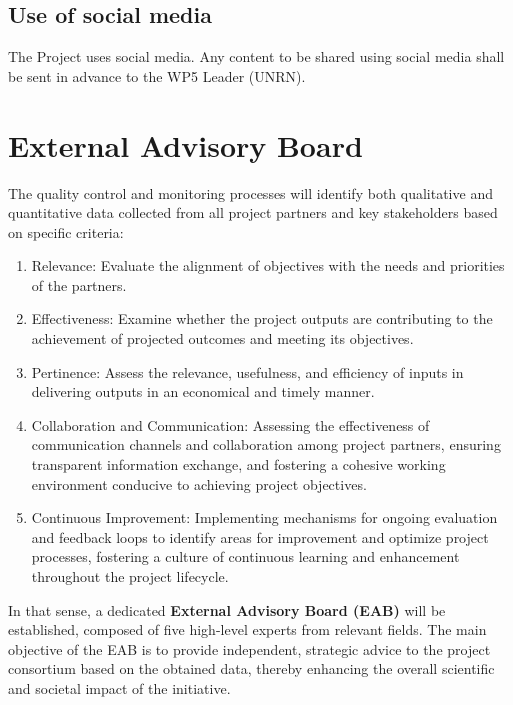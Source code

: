\documentclass[
  12pt,
  oneside]{book}
\providecommand{\tightlist}{%
  \setlength{\itemsep}{0pt}\setlength{\parskip}{0pt}}\usepackage{longtable,booktabs,array}
\begin{document}
\section{Use of social media}\label{use-of-social-media}

The Project uses social media. Any content to be shared using social
media shall be sent in advance to the WP5 Leader (UNRN).

\chapter{External Advisory Board}\label{external-advisory-board}

The quality control and monitoring processes will identify both
qualitative and quantitative data collected from all project partners
and key stakeholders based on specific criteria:

\begin{enumerate}
\def\labelenumi{\arabic{enumi}.}
\tightlist
\item
  Relevance: Evaluate the alignment of objectives with the needs and
  priorities of the partners.
\item
  Effectiveness: Examine whether the project outputs are contributing to
  the achievement of projected outcomes and meeting its objectives.
\item
  Pertinence: Assess the relevance, usefulness, and efficiency of inputs
  in delivering outputs in an economical and timely manner.
\item
  Collaboration and Communication: Assessing the effectiveness of
  communication channels and collaboration among project partners,
  ensuring transparent information exchange, and fostering a cohesive
  working environment conducive to achieving project objectives.
\item
  Continuous Improvement: Implementing mechanisms for ongoing evaluation
  and feedback loops to identify areas for improvement and optimize
  project processes, fostering a culture of continuous learning and
  enhancement throughout the project lifecycle.
\end{enumerate}

In that sense, a dedicated \textbf{External Advisory Board (EAB)} will
be established, composed of five high-level experts from relevant
fields. The main objective of the EAB is to provide independent,
strategic advice to the project consortium based on the obtained data,
thereby enhancing the overall scientific and societal impact of the
initiative.
\end{document}
